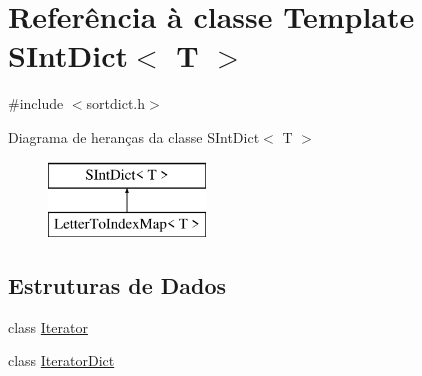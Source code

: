 \hypertarget{class_s_int_dict}{\section{Referência à classe Template S\-Int\-Dict$<$ T $>$}
\label{class_s_int_dict}
}


{\ttfamily \#include $<$sortdict.\-h$>$}

Diagrama de heranças da classe S\-Int\-Dict$<$ T $>$\begin{figure}[H]
\begin{center}
\leavevmode
\includegraphics[height=2.000000cm]{class_s_int_dict}
\end{center}
\end{figure}
\subsection*{Estruturas de Dados}
\begin{DoxyCompactItemize}
\item 
class \hyperlink{class_s_int_dict_1_1_iterator}{Iterator}
\item 
class \hyperlink{class_s_int_dict_1_1_iterator_dict}{Iterator\-Dict}
\end{DoxyCompactItemize}
